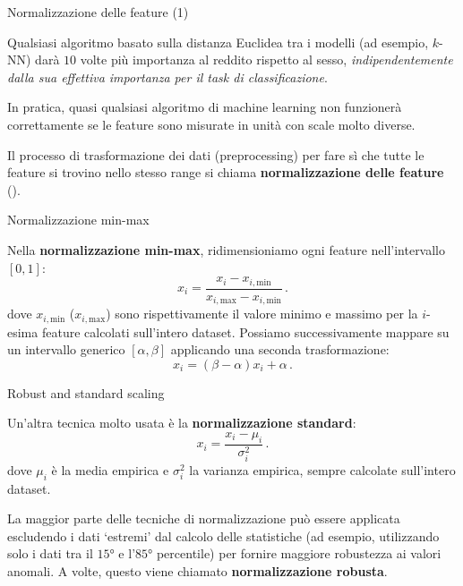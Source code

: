 \documentclass[12pt,aspectratio=169]{beamer}
\begin{document}
\begin{frame}{Normalizzazione delle feature (1)}
	
	Qualsiasi algoritmo basato sulla distanza Euclidea tra i modelli (ad esempio, $k$-NN) darà $10$ volte più importanza al reddito rispetto al sesso, \textit{indipendentemente dalla sua effettiva importanza per il task di classificazione}.
	
	In pratica, quasi qualsiasi algoritmo di machine learning non funzionerà correttamente se le feature sono misurate in unità con scale molto diverse.
	
	Il processo di trasformazione dei dati (preprocessing) per fare sì che tutte le feature si trovino nello stesso range si chiama \textbf{normalizzazione delle feature} ().
	
\end{frame}

\begin{frame}{Normalizzazione min-max}

	Nella \textbf{normalizzazione min-max}, ridimensioniamo ogni feature nell'intervallo $\left[0,1\right]$:
	$$
	x_i = \frac{x_i - x_{i, \text{min}}}{x_{i, \text{max}} - x_{i, \text{min}}} \,.
	$$
	dove $x_{i, \text{min}}$ ($x_{i, \text{max}}$) sono rispettivamente il valore minimo e massimo per la $i$-esima feature calcolati sull'intero dataset. Possiamo successivamente mappare su un intervallo generico $\left[\alpha, \beta\right]$ applicando una seconda trasformazione:
	$$
	x_i = (\beta - \alpha)x_i + \alpha \,.
	$$
	
\end{frame}

\begin{frame}{Robust and standard scaling}
	
	Un'altra tecnica molto usata è la \textbf{normalizzazione standard}:
	$$
	x_i = \frac{x_i - \mu_i}{\sigma_i^2} \,.
	$$
	dove $\mu_i$ è la media empirica e $\sigma_i^2$ la varianza empirica, sempre calcolate sull'intero dataset.
	
	La maggior parte delle tecniche di normalizzazione può essere applicata escludendo i dati `estremi' dal calcolo delle statistiche (ad esempio, utilizzando solo i dati tra il $15$° e l'$85$° percentile) per fornire maggiore robustezza ai valori anomali. A volte, questo viene chiamato \textbf{normalizzazione robusta}.
	
\end{frame}
\end{document}
